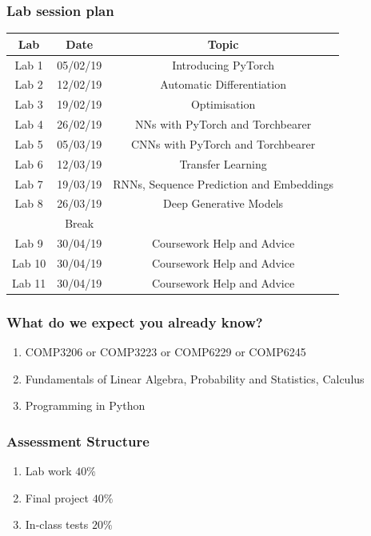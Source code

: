 \documentclass[\beamerclass]{beamer}
\begin{document}
\begin{frame}
	\frametitle{Lab session plan}
	
	\begin{center}
	\begin{tabular}{ c c c }
		 Lab & Date & Topic \\ \hline
		 Lab 1 &  05/02/19 & Introducing PyTorch \\ 
		 Lab 2 & 12/02/19 & Automatic Differentiation \\  
		 Lab 3 & 19/02/19 & Optimisation   \\
		 Lab 4 & 26/02/19 & NNs with PyTorch and Torchbearer   \\
 		Lab 5 & 05/03/19 & CNNs with PyTorch and Torchbearer   \\
 		Lab 6 & 12/03/19 & Transfer Learning \\
 		Lab 7 & 19/03/19 & RNNs, Sequence Prediction and Embeddings \\
		 Lab 8 & 26/03/19 & Deep Generative Models\\ \hline 
		 & Break & \\
		 \hline
		 Lab 9 & 30/04/19 & Coursework Help and Advice \\
		 Lab 10 & 30/04/19 & Coursework Help and Advice \\
 		 Lab 11 & 30/04/19 & Coursework Help and Advice \\
	\end{tabular}
	\end{center}
\end{frame}

\begin{frame}
	\frametitle{What do we expect you already know?}
	
	\begin{enumerate}
	\item COMP3206 or COMP3223 or COMP6229 or COMP6245
	\item Fundamentals of Linear Algebra, Probability and Statistics, Calculus
	\item Programming in Python
	\end{enumerate}
\end{frame}


\begin{frame}
	\frametitle{Assessment Structure}
	\begin{enumerate}
		\item Lab work $40\%$
		\item Final project $40\%$ \\  
		\item In-class tests $20\%$ \\	
	\end{enumerate}
\end{frame}
\end{document}

